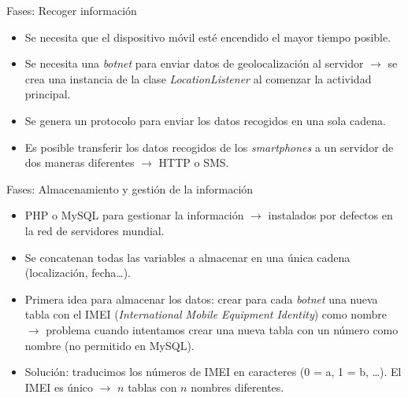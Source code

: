 \documentclass[aspectratio=43]{beamer}
\begin{document}
\begin{frame}{Fases: Recoger información}
  
  \begin{itemize}
  
  \item Se necesita que el dispositivo móvil esté encendido el mayor tiempo posible.   
  
  \item Se necesita una \emph{botnet} para enviar datos de geolocalización
al servidor $\rightarrow$  se crea una instancia de la clase \emph{LocationListener} al comenzar la actividad principal.

  \item Se genera un protocolo para enviar los datos recogidos en una sola cadena. 
  
  \item Es posible transferir los datos recogidos de los \emph{smartphones} a un servidor de dos maneras diferentes
  $\rightarrow$  HTTP o SMS.

  \end{itemize}
\end{frame}

\begin{frame}{Fases: Almacenamiento y gestión de la información}

\begin{itemize}
  
  \item PHP o MySQL para gestionar la información $\rightarrow$  instalados por defectos en la red de servidores mundial.   

  \item Se concatenan todas las variables a almacenar en una única cadena (localización, fecha\ldots). 
  
  \item Primera idea para almacenar los datos: crear para cada \emph{botnet} una nueva tabla con el IMEI (\emph{International Mobile Equipment Identity}) como nombre $\rightarrow$  problema cuando intentamos crear una nueva tabla con un número como nombre (no permitido en MySQL).
  
  \item Solución: traducimos los números de IMEI en caracteres (0 = a, 1 = b, \ldots).  El IMEI es único $\rightarrow$   $n$ tablas con $n$ nombres diferentes.

  \end{itemize}
  
\end{frame}
\end{document}
